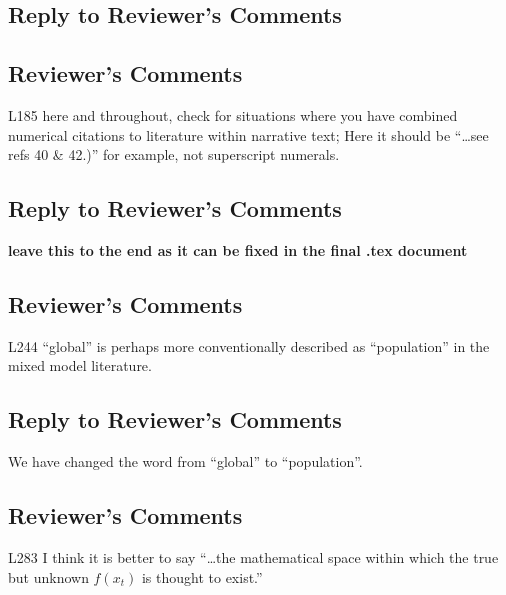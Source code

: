 \documentclass[
]{article}
\begin{document}
\hypertarget{section-16}{%
\subsection{\texorpdfstring{\textcolor{reviewersblue} {Reply to Reviewer's Comments}}{}}\label{section-16}}

\hypertarget{reviewers-comments-17}{%
\subsection{Reviewer's Comments}\label{reviewers-comments-17}}

L185 here and throughout, check for situations where you have combined numerical citations to literature within narrative text; Here it should be ``\ldots see refs 40 \& 42.)'' for example, not superscript numerals.

\hypertarget{section-17}{%
\subsection{\texorpdfstring{\textcolor{reviewersblue} {Reply to Reviewer's Comments}}{}}\label{section-17}}

\textbf{leave this to the end as it can be fixed in the final .tex document}

\hypertarget{reviewers-comments-18}{%
\subsection{Reviewer's Comments}\label{reviewers-comments-18}}

L244 ``global'' is perhaps more conventionally described as ``population'' in the mixed model literature.

\hypertarget{section-18}{%
\subsection{\texorpdfstring{\textcolor{reviewersblue} {Reply to Reviewer's Comments}}{}}\label{section-18}}

We have changed the word from ``global'' to ``population''.

\hypertarget{reviewers-comments-19}{%
\subsection{Reviewer's Comments}\label{reviewers-comments-19}}

L283 I think it is better to say ``\ldots the mathematical space within which the true but unknown \(f(x_t)\) is thought to exist.''
\end{document}
